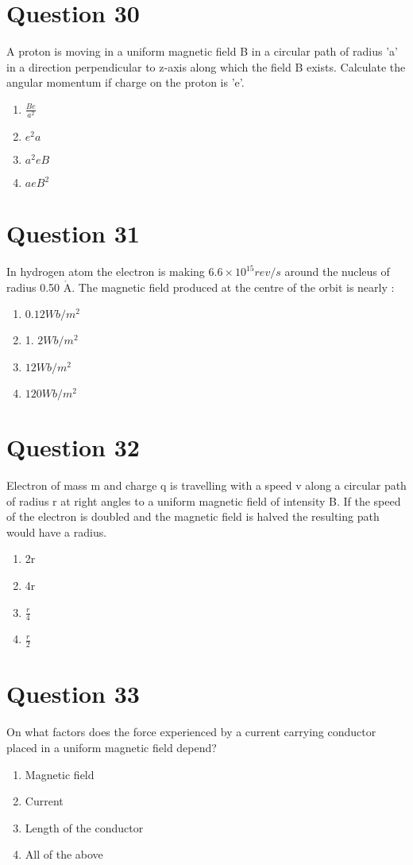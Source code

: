 \documentclass{article}
\begin{document}
\section*{Question 30}
A proton is moving in a uniform magnetic field B in a circular path of radius 'a' in a direction perpendicular to z-axis along which the field B exists. Calculate the angular momentum if charge on the proton is 'e'.
\begin{enumerate}[label=(\alph*)]
\item \(\frac{ Be }{ a ^2}\)
\item \(e^2 a\)
\item \(a^2 e B\)
\item \(aeB ^2\)
\end{enumerate}
\newpage
\section*{Question 31}
In hydrogen atom the electron is making \(6.6 \times 10^{15} rev / s\) around the nucleus of radius 0.50 \(\mathring{\mathrm{A}}\). The magnetic field produced at the centre of the orbit is nearly :
\begin{enumerate}[label=(\alph*)]
\item \(0.12 W b / m ^2\)
\item 1. \(2 Wb / m ^2\)
\item \(12 Wb / m ^2\)
\item \(120 Wb / m ^2\)
\end{enumerate}
\newpage
\section*{Question 32}
Electron of mass m and charge q is travelling with a speed v along a circular path of radius r at right angles to a uniform magnetic field of intensity B. If the speed of the electron is doubled and the magnetic field is halved the resulting path would have a radius.
\begin{enumerate}[label=(\alph*)]
\item 2r
\item 4r
\item \(\frac{r}{4}\)
\item \(\frac{r}{2}\)
\end{enumerate}
\newpage
\section*{Question 33}
On what factors does the force experienced by a current carrying conductor placed in a uniform magnetic field depend?
\begin{enumerate}[label=(\alph*)]
\item Magnetic field
\item Current
\item Length of the conductor
\item All of the above
\end{enumerate}
\newpage
\end{document}
